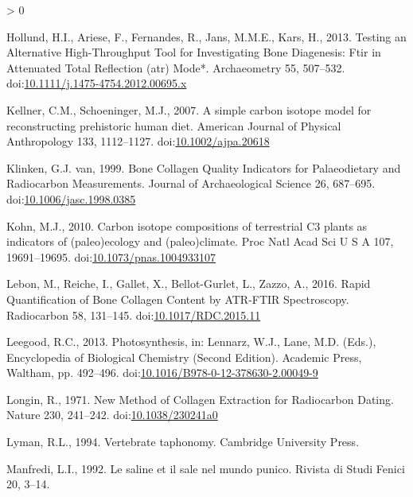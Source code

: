 \documentclass[5p]{elsarticle} %
\newlength{\cslhangindent}
\newenvironment{CSLReferences}[2] %
 {%
  \setlength{\parindent}{0pt}
  \ifodd #1 \everypar{\setlength{\hangindent}{\cslhangindent}}\ignorespaces\fi
  \ifnum #2 > 0
  \setlength{\parskip}{#2\baselineskip}
  \fi
 }%
 {}
\begin{document}
\begin{CSLReferences}{1}{0}
\leavevmode\hypertarget{ref-hollund_etal13}{}%
Hollund, H.I., Ariese, F., Fernandes, R., Jans, M.M.E., Kars, H., 2013. Testing an {Alternative High}-{Throughput Tool} for {Investigating Bone Diagenesis}: {Ftir} in {Attenuated Total Reflection} (atr) {Mode}*. Archaeometry 55, 507--532. doi:\href{https://doi.org/10.1111/j.1475-4754.2012.00695.x}{10.1111/j.1475-4754.2012.00695.x}

\leavevmode\hypertarget{ref-kellner_schoeninger07}{}%
Kellner, C.M., Schoeninger, M.J., 2007. A simple carbon isotope model for reconstructing prehistoric human diet. American Journal of Physical Anthropology 133, 1112--1127. doi:\href{https://doi.org/10.1002/ajpa.20618}{10.1002/ajpa.20618}

\leavevmode\hypertarget{ref-vanklinken99}{}%
Klinken, G.J. van, 1999. Bone {Collagen Quality Indicators} for {Palaeodietary} and {Radiocarbon Measurements}. Journal of Archaeological Science 26, 687--695. doi:\href{https://doi.org/10.1006/jasc.1998.0385}{10.1006/jasc.1998.0385}

\leavevmode\hypertarget{ref-kohn10}{}%
Kohn, M.J., 2010. Carbon isotope compositions of terrestrial {C3} plants as indicators of (paleo)ecology and (paleo)climate. Proc Natl Acad Sci U S A 107, 19691--19695. doi:\href{https://doi.org/10.1073/pnas.1004933107}{10.1073/pnas.1004933107}

\leavevmode\hypertarget{ref-lebon_etal16}{}%
Lebon, M., Reiche, I., Gallet, X., Bellot-Gurlet, L., Zazzo, A., 2016. Rapid {Quantification} of {Bone Collagen Content} by {ATR}-{FTIR Spectroscopy}. Radiocarbon 58, 131--145. doi:\href{https://doi.org/10.1017/RDC.2015.11}{10.1017/RDC.2015.11}

\leavevmode\hypertarget{ref-leegood13}{}%
Leegood, R.C., 2013. Photosynthesis, in: Lennarz, W.J., Lane, M.D. (Eds.), Encyclopedia of {Biological Chemistry} ({Second Edition}). {Academic Press}, {Waltham}, pp. 492--496. doi:\href{https://doi.org/10.1016/B978-0-12-378630-2.00049-9}{10.1016/B978-0-12-378630-2.00049-9}

\leavevmode\hypertarget{ref-longin71}{}%
Longin, R., 1971. New {Method} of {Collagen Extraction} for {Radiocarbon Dating}. Nature 230, 241--242. doi:\href{https://doi.org/10.1038/230241a0}{10.1038/230241a0}

\leavevmode\hypertarget{ref-lyman94}{}%
Lyman, R.L., 1994. Vertebrate taphonomy. {Cambridge University Press}.

\leavevmode\hypertarget{ref-manfredi92}{}%
Manfredi, L.I., 1992. Le saline et il sale nel mundo punico. Rivista di Studi Fenici 20, 3--14.


\end{CSLReferences}
\end{document}

